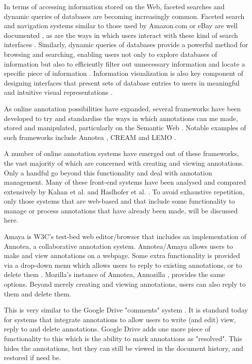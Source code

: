 In terms of accessing information stored on the Web, faceted searches and dynamic queries of databases are becoming increasingly common. Faceted search and navigation systems similar to those used by Amazon.com \citep{Amazon} or eBay \citep{eBay} are well documented \citep{Hearst} \citep{Yitzhak}, as are the ways in which users interact with these kind of search interfaces \citep{Kules}. Similarly, dynamic queries of databases provide a powerful method for browsing and searching, enabling users not only to explore databases of information but also to efficiently filter out unnecessary information and locate a specific piece of information \cite{ShneidermanDynamic} \citep{PlaisantQueryPreview}. Information visualization is also key component of designing interfaces that present sets of database entries to users in meaningful and intuitive visual representations \citep{Card}. 

As online annotation possibilities have expanded, several frameworks have been developed to try and standardise the ways in which annotations can me made, stored and manipulated, particularly on the Semantic Web \citep{Berners-Lee} \citep{Uren}. Notable examples of such frameworks include Annotea \citep{kahan2002annotea}, CREAM \citep{handschuh2002authoring} and LEMO \citep{LEMO}.  

A number of online annotation systems have emerged out of these frameworks, the vast majority of which are concerned with creating and viewing annotations. Only a handful go beyond this functionality and deal with annotation management. Many of these front-end systems have been analysed and compared extensively by Kahan et al. \citep{kahan2002annotea} and Haslhofer et al. \citep{LEMO}. To avoid exhaustive repetition, only those systems that are web-based and that include some functionality to manage or process annotations that have already been made, will be discussed here.

Amaya \citep{Amaya} is W3C's test-bed web editor/browser that includes an implementation of Annotea, a collaborative annotation system. Annotea/Amaya allows users to make and view annotations on a webpage. Some extra functionality is provided via a drop-down menu which allows users to reply to existing annotations, or to delete them \citep{Annotea}. Mozilla's instance of Annotea, Annozilla \citep{Annozilla}, provides the same options. Beyond merely creating and viewing annotations, users can also reply to them and delete them. 

This is very similar to the Google Drive "comments" system \citep{GDrive}. It is standard today for systems that integrate annotations to allow users to write (and edit) view, reply to and delete annotations. Google Drive adds one more piece of functionality to this which is the ability to mark annotations as "resolved". This hides the annotations, but they can still be viewed in the document history, and restored if need be.

